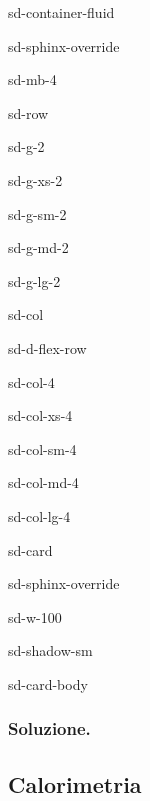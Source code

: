 \documentclass[letterpaper,10pt,italian]{jupyterBook}
\begin{document}
\begin{sphinxuseclass}{sd-container-fluid}
\begin{sphinxuseclass}{sd-sphinx-override}
\begin{sphinxuseclass}{sd-mb-4}
\begin{sphinxuseclass}{sd-row}
\begin{sphinxuseclass}{sd-g-2}
\begin{sphinxuseclass}{sd-g-xs-2}
\begin{sphinxuseclass}{sd-g-sm-2}
\begin{sphinxuseclass}{sd-g-md-2}
\begin{sphinxuseclass}{sd-g-lg-2}
\begin{sphinxuseclass}{sd-col}
\begin{sphinxuseclass}{sd-d-flex-row}
\begin{sphinxuseclass}{sd-col-4}
\begin{sphinxuseclass}{sd-col-xs-4}
\begin{sphinxuseclass}{sd-col-sm-4}
\begin{sphinxuseclass}{sd-col-md-4}
\begin{sphinxuseclass}{sd-col-lg-4}
\begin{sphinxuseclass}{sd-card}
\begin{sphinxuseclass}{sd-sphinx-override}
\begin{sphinxuseclass}{sd-w-100}
\begin{sphinxuseclass}{sd-shadow-sm}
\begin{sphinxuseclass}{sd-card-body}
\end{sphinxuseclass}
\end{sphinxuseclass}
\end{sphinxuseclass}
\end{sphinxuseclass}
\end{sphinxuseclass}
\end{sphinxuseclass}
\end{sphinxuseclass}
\end{sphinxuseclass}
\end{sphinxuseclass}
\end{sphinxuseclass}
\end{sphinxuseclass}
\end{sphinxuseclass}
\end{sphinxuseclass}
\end{sphinxuseclass}
\end{sphinxuseclass}
\end{sphinxuseclass}
\end{sphinxuseclass}
\end{sphinxuseclass}
\end{sphinxuseclass}
\end{sphinxuseclass}
\end{sphinxuseclass}\subsubsection*{Soluzione.}


\subsection{Calorimetria}
\label{\detokenize{ch/thermodynamics/foundation-problems:calorimetria}}
\end{document}
